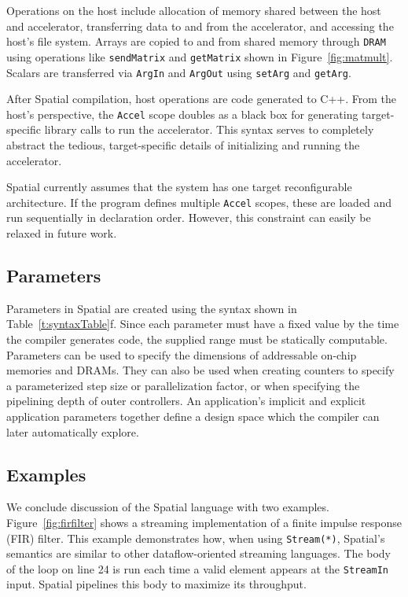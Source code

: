 Operations on the host include allocation of memory shared between the host and accelerator, transferring data to and from the accelerator, and accessing the host's file system. 
Arrays are copied to and from shared memory through \texttt{\small{DRAM}} using operations like \texttt{\small{sendMatrix}} and \texttt{\small{getMatrix}} shown in Figure~\ref{fig:matmult}. Scalars are transferred via \texttt{\small{ArgIn}} and \texttt{\small{ArgOut}} using \texttt{\small{setArg}} and \texttt{\small{getArg}}.

After Spatial compilation, host operations are code generated to C++.
From the host's perspective, the \texttt{\small{Accel}} scope doubles as a black box for generating target-specific library calls to run the accelerator. 
This syntax serves to completely abstract the tedious, target-specific details of initializing and running the accelerator.

Spatial currently assumes that the system has one target reconfigurable architecture. 
If the program defines multiple \texttt{\small{Accel}} scopes, these are loaded and run sequentially in declaration order. However, this constraint can easily be relaxed in future work.



\subsection{Parameters}
Parameters in Spatial are created using the syntax shown in Table~\ref{t:syntaxTable}f. 
Since each parameter must have a fixed value by the time the compiler generates code, the supplied range must be statically computable.
Parameters can be used to specify the dimensions of addressable on-chip memories and DRAMs. 
They can also be used when creating counters to specify a parameterized step size or parallelization factor, or when specifying the pipelining depth of outer controllers. 
An application's implicit and explicit application parameters together define a design space which the compiler can later automatically explore. 

\subsection{Examples}




We conclude discussion of the Spatial language with two examples. 
Figure~\ref{fig:firfilter} shows a streaming implementation of a finite impulse response (FIR) filter. 
This example demonstrates how, when using \texttt{\small{Stream(*)}}, Spatial's semantics are similar to other dataflow-oriented streaming languages. The body of the loop on line 24 is run each time a valid element appears at the \texttt{\small{StreamIn}} input. Spatial pipelines this body to maximize its throughput.

